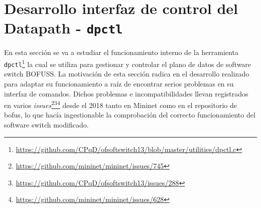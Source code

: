 \section{Desarrollo interfaz de control del Datapath - \texttt{dpctl}}
\label{sec:dpctl}

En esta sección se va a estudiar el funcionamiento interno de la herramienta \texttt{dpctl}\footnote{\url{https://github.com/CPqD/ofsoftswitch13/blob/master/utilities/dpctl.c}} la cual se utiliza para gestionar y controlar el plano de datos de software switch BOFUSS. La motivación de esta sección radica en el desarrollo realizado para adaptar su funcionamiento a raíz de encontrar serios problemas en su interfaz de comandos. Dichos problemas e incompatibilidades llevan registrados en varios \textit{issues}\footnote{\url{https://github.com/mininet/mininet/issues/745}}\footnote{\url{https://github.com/CPqD/ofsoftswitch13/issues/288}}\footnote{\url{https://github.com/mininet/mininet/issues/628}} desde el 2018 tanto en Mininet como en el repositorio de \gls{bofus}, lo que hacía ingestionable la comprobación del correcto funcionamiento del software switch modificado.